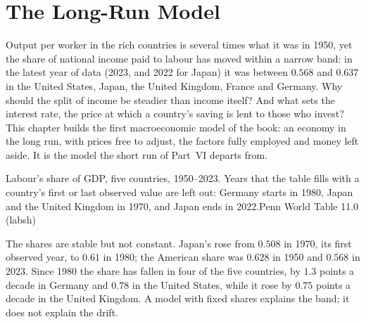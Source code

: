 \chapter{The Long-Run Model}\label{ch:b1:long-run-model}

Output per worker in the rich countries is several times what it was in
1950, yet the share of national income paid to labour has moved within a
narrow band: in the latest year of data (2023, and 2022 for Japan) it was
between $0.568$ and $0.637$ in the United States, Japan, the United Kingdom,
France and Germany. %
Why should the split of income be steadier than income itself? And what
sets the interest rate, the price at which a country's saving is lent to
those who invest? This chapter builds the first macroeconomic model of the
book: an economy in the long run, with prices free to adjust, the factors
fully employed and money left aside. It is the model the short run of
Part~VI departs from.

\begin{openingchart}{Labour's share of GDP, five countries, 1950--2023. Years
that the table fills with a country's first or last observed value are left
out: Germany starts in 1980, Japan and the United Kingdom in 1970, and
Japan ends in 2022.}{Penn World Table 11.0 (labsh)}
\end{openingchart}

The shares are stable but not constant. Japan's rose from $0.508$ in 1970,
its first observed year, to $0.61$ in 1980; the American share was $0.628$ in 1950 and $0.568$ in 2023.
Since 1980 the share has fallen in four of the five countries, by $1.3$
points a decade in Germany and $0.78$ in the United States, while it rose by
$0.75$ points a decade in the United Kingdom. %
A model with fixed shares explains the band; it does not explain the
drift.

